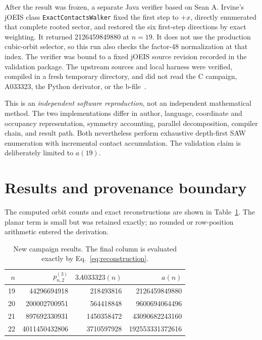 \documentclass[11pt]{article}
\theoremstyle{definition}
\theoremstyle{remark}
\begin{document}
After the result was frozen, a separate Java verifier based on Sean A.
Irvine's jOEIS class \texttt{ExactContactsWalker} fixed the first step to
$+x$, directly enumerated that complete rooted sector, and restored the six
first-step directions by exact weighting.  It returned 2126459849880 at
$n=19$.  It does not use the production cubic-orbit selector, so this run also
checks the factor-48 normalization at that index.  The verifier was bound to a
fixed jOEIS source revision recorded in the validation package.  The upstream
sources and local harness were verified, compiled in a fresh temporary
directory, and did not read the C campaign, A033323, the Python derivator, or
the b-file~\cite{JoeisRepository}.

This is an \emph{independent software reproduction}, not an independent
mathematical method.  The two implementations differ in author, language,
coordinate and occupancy representation, symmetry accounting, parallel
decomposition, compiler chain, and result path.  Both nevertheless perform
exhaustive depth-first SAW enumeration with incremental contact accumulation.
The validation claim is deliberately limited to $a(19)$.

\section{Results and provenance boundary}

The computed orbit counts and exact reconstructions are shown in
Table~\ref{tab:computed}.  The planar term is small but was retained exactly;
no rounded or row-position arithmetic entered the derivation.

\begin{table}[ht]
\centering
\caption{New campaign results.  The final column is evaluated exactly by
Eq.~\eqref{eq:reconstruction}.}
\label{tab:computed}
\begin{tabular}{r@{\quad}r@{\quad}r@{\quad}r}
\toprule
$n$ & $p_{n,2}^{(3)}$ & $3A033323(n)$ & $a(n)$ \\
\midrule
19 & 44296694918   & 218493816  & 2126459849880 \\
20 & 200002700951  & 564418848  & 9600694064496 \\
21 & 897692330931  & 1450358472 & 43090682243160 \\
22 & 4011450432806 & 3710597928 & 192553331372616 \\
\bottomrule
\end{tabular}
\end{table}
\end{document}
